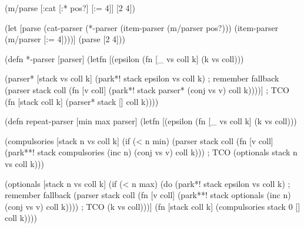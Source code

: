 \documentclass{beamer}
\begin{document}

\begin{frame}[fragile]

{\scriptsize
\begin{semiverbatim}
(m/parse [:cat [:* pos?] [:= 4]] [2 4])
\end{semiverbatim}

\begin{semiverbatim}
(let [parse (cat-parser (*-parser (item-parser (m/parser pos?)))
                        (item-parser (m/parser [:= 4])))]
  (parse [2 4]))
\end{semiverbatim}
}

\end{frame}


\begin{frame}[fragile]

{\scriptsize
\begin{semiverbatim}
(defn *-parser [parser]
  (letfn [(epsilon (fn [_ vs coll k] (k vs coll)))

          (parser* [stack vs coll k]
            (park*! stack epsilon vs coll k) ; remember fallback
            (parser stack coll
                    (fn [v coll]
                      (park*! stack parser* (conj vs v) coll k))))] ; TCO
    (fn [stack coll k] (parser* stack [] coll k))))
\end{semiverbatim}
}

\end{frame}


\begin{frame}[fragile]

{\scriptsize
\begin{semiverbatim}
(defn repeat-parser [min max parser]
  (letfn [(epsilon (fn [_ vs coll k] (k vs coll)))

          (compulsories [stack n vs coll k]
            (if (< n min)
              (parser stack coll
                      (fn [v coll]
                        (park**! stack compulsories
                                 (inc n) (conj vs v) coll k))) ; TCO
              (optionals stack n vs coll k)))

          (optionals [stack n vs coll k]
            (if (< n max)
              (do
                (park*! stack epsilon vs coll k) ; remember fallback
                (parser stack coll
                        (fn [v coll]
                          (park**! stack optionals
                                   (inc n) (conj vs v) coll k)))) ; TCO
              (k vs coll)))]
    (fn [stack coll k] (compulsories stack 0 [] coll k))))
\end{semiverbatim}
}

\end{frame}
\end{document}
